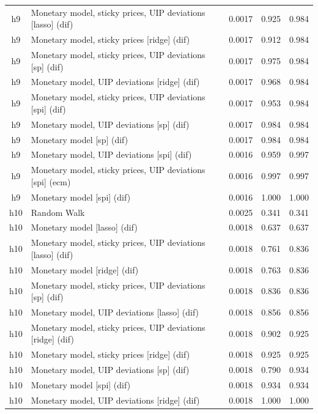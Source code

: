 \begin{ThreePartTable}
\begin{longtable}[t]{cp{5.5cm}ccc}
h9 & \raggedright Monetary model, sticky prices, UIP deviations [lasso] (dif) & 0.0017 & 0.925 & 0.984\\
h9 & \raggedright Monetary model, sticky prices [ridge] (dif) & 0.0017 & 0.912 & 0.984\\
h9 & \raggedright Monetary model, sticky prices, UIP deviations [sp] (dif) & 0.0017 & 0.975 & 0.984\\
h9 & \raggedright Monetary model, UIP deviations [ridge] (dif) & 0.0017 & 0.968 & 0.984\\
h9 & \raggedright Monetary model, sticky prices, UIP deviations [spi] (dif) & 0.0017 & 0.953 & 0.984\\
h9 & \raggedright Monetary model, UIP deviations [sp] (dif) & 0.0017 & 0.984 & 0.984\\
h9 & \raggedright Monetary model [sp] (dif) & 0.0017 & 0.984 & 0.984\\
h9 & \raggedright Monetary model, UIP deviations [spi] (dif) & 0.0016 & 0.959 & 0.997\\
h9 & \raggedright Monetary model, sticky prices, UIP deviations [spi] (ecm) & 0.0016 & 0.997 & 0.997\\
h9 & \raggedright Monetary model [spi] (dif) & 0.0016 & 1.000 & 1.000\\
\addlinespace
h10 & \raggedright Random Walk & 0.0025 & 0.341 & 0.341\\
h10 & \raggedright Monetary model [lasso] (dif) & 0.0018 & 0.637 & 0.637\\
h10 & \raggedright Monetary model, sticky prices, UIP deviations [lasso] (dif) & 0.0018 & 0.761 & 0.836\\
h10 & \raggedright Monetary model [ridge] (dif) & 0.0018 & 0.763 & 0.836\\
h10 & \raggedright Monetary model, sticky prices, UIP deviations [sp] (dif) & 0.0018 & 0.836 & 0.836\\
h10 & \raggedright Monetary model, UIP deviations [lasso] (dif) & 0.0018 & 0.856 & 0.856\\
h10 & \raggedright Monetary model, sticky prices, UIP deviations [ridge] (dif) & 0.0018 & 0.902 & 0.925\\
h10 & \raggedright Monetary model, sticky prices [ridge] (dif) & 0.0018 & 0.925 & 0.925\\
h10 & \raggedright Monetary model, UIP deviations [sp] (dif) & 0.0018 & 0.790 & 0.934\\
h10 & \raggedright Monetary model [spi] (dif) & 0.0018 & 0.934 & 0.934\\
h10 & \raggedright Monetary model, UIP deviations [ridge] (dif) & 0.0018 & 1.000 & 1.000\\

\end{longtable}
\end{ThreePartTable}

